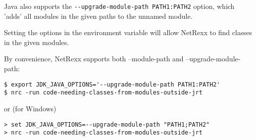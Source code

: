 Java also supports the \texttt{-{}-upgrade-module-path PATH1:PATH2} option, which 'adds' all modules in the given paths to the unnamed module.

Setting the options in the  environment variable will allow NetRexx to find classes in the given modules.

By convenience, NetRexx supports both --module-path and --upgrade-module-path:

\begin{verbatim}
$ export JDK_JAVA_OPTIONS='--upgrade-module-path PATH1:PATH2'
$ nrc -run code-needing-classes-from-modules-outside-jrt
\end{verbatim}
or (for Windows)
\begin{verbatim}
> set JDK_JAVA_OPTIONS=--upgrade-module-path "PATH1;PATH2"
> nrc -run code-needing-classes-from-modules-outside-jrt
\end{verbatim}
